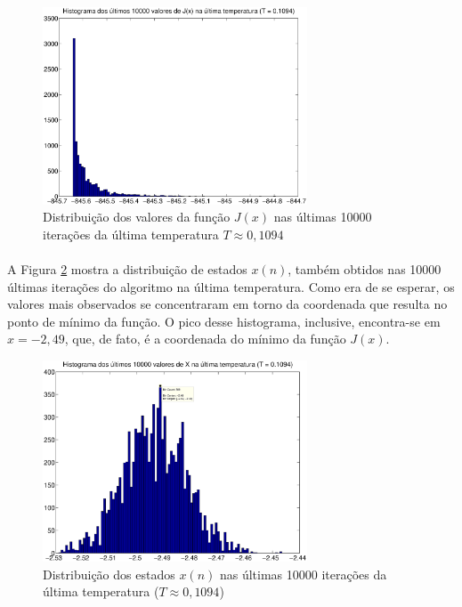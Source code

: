 \documentclass{report}
\begin{document}
\begin{figure}[H]
	\centering
	\includegraphics[width = 0.7\textwidth]{Q05_histograma_J.eps}
	\caption{Distribuição dos valores da função $J(x)$ nas últimas 10000 iterações da última temperatura $T \approx 0,1094$}
	\label{fig_histograma_J_q_5}
\end{figure}

\paragraph{} A Figura \ref{fig_histograma_x_q_5} mostra a distribuição de estados $x(n)$, também obtidos nas 10000 últimas iterações do algoritmo na última temperatura. Como era de se esperar, os valores mais observados se concentraram em torno da coordenada que resulta no ponto de mínimo da função. O pico desse histograma, inclusive, encontra-se em $x = -2,49$, que, de fato, é a coordenada do mínimo da função $J(x)$.

\begin{figure}
	\centering
	\includegraphics[width = 0.7\textwidth]{Q05_histograma_x.eps}
	\caption{Distribuição dos estados $x(n)$ nas últimas 10000 iterações da última temperatura ($T \approx 0,1094$)}
	\label{fig_histograma_x_q_5}
\end{figure}
\end{document}
